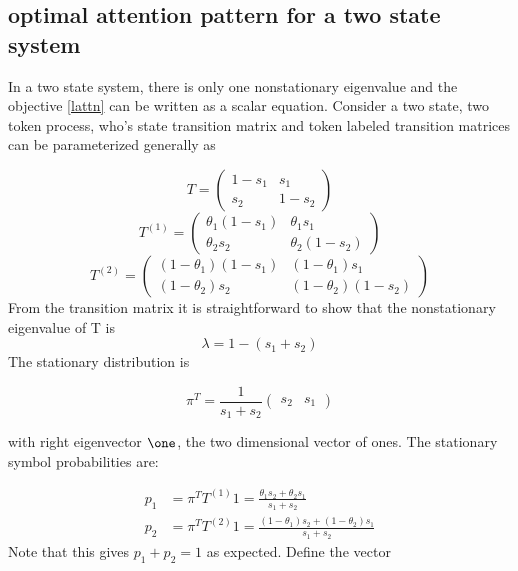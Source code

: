 \documentclass{article}
\begin{document}
\subsection{optimal attention pattern for a two state system}
In a two state system, there is only one nonstationary eigenvalue and the objective \eqref{lattn} can be written as a scalar equation. Consider a two state, two token process, who's state transition matrix and token labeled transition matrices can be parameterized generally as

\begin{equation}\label{Tts}
T = \begin{pmatrix}
1-s_1 & s_1\\
s_2 & 1-s_2
\end{pmatrix}
\end{equation}
\begin{equation}\label{T1ts}
T^{(1)} = \begin{pmatrix}
\theta_1(1-s_1) & \theta_1s_1 \\
\theta_2 s_2 & \theta_2(1-s_2)
\end{pmatrix}
\end{equation}
\begin{equation}\label{T2ts}
T^{(2)} = \begin{pmatrix}
(1-\theta_1)(1-s_1) & (1-\theta_1)s_1 \\
(1-\theta_2) s_2 & (1-\theta_2)(1-s_2)
\end{pmatrix}
\end{equation}
From the transition matrix it is straightforward to show that the nonstationary eigenvalue of T is 
\begin{equation}\label{lamts}
\lambda =1- (s_1+s_2)
\end{equation}
The stationary distribution is

\begin{equation}
\pi^T = \frac{1}{s_1 + s_2}\begin{pmatrix}
s_2 & s_1
\end{pmatrix}
\end{equation}

with right eigenvector $\one$, the two dimensional vector of ones. The stationary symbol probabilities are:

\begin{align}
	p_1 &= \pi^T T^{(1)}1 = \frac{\theta_1s_2 + \theta_2s_1}{s_1+s_2} \label{p1}\\
	p_2 &= \pi^T T^{(2)}1 = \frac{(1-\theta_1)s_2 + (1-\theta_2)s_1}{s_1+s_2}\label{p2}
\end{align}
Note that this gives $p_1 + p_2 = 1$ as expected. Define the vector 
\end{document}
